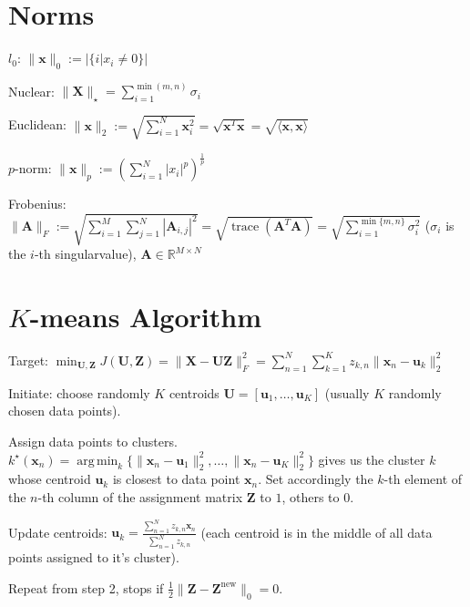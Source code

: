 \documentclass[a4paper, 11pt, landscape]{article}
\DeclareMathOperator*{\argmin}{arg\,min}
\begin{document}
\begin{multicols*}{3}
\section{Norms}
\begin{inparadesc}
	\item[\color{red}$l_0$:] $\|\mathbf{x}\|_0 := |\{i | x_i \neq 0\}|$
	\item[\color{red}Nuclear:] $\|\mathbf{X}\|_\star = \sum_{i=1}^{\min(m, n)} \sigma_i$
	\item[\color{red}Euclidean:] $\|\mathbf{x}\|_2 := \sqrt{\sum_{i=1}^{N} \mathbf{x}_i^2} = \sqrt{\mathbf{x}^T \mathbf{x}} = \sqrt{\langle \mathbf{x}, \mathbf{x} \rangle}$
	\item[\color{red}$p$-norm:] $\|\mathbf{x}\|_p := \left( \sum_{i=1}^{N} |x_i|^p \right)^{\frac{1}{p}}$
	\item[\color{red}Frobenius:] $\|\mathbf{A}\|_F :=\allowbreak \sqrt{\sum_{i=1}^{M} \sum_{j=1}^{N} |\mathbf{A}_{i, j}|^2} =\allowbreak \sqrt{\operatorname{trace}(\mathbf{A}^T \mathbf{A})} =\allowbreak \sqrt{\sum_{i=1}^{\min\{m, n\}} \sigma_i^2}$ ($\sigma_i$ is the $i$-th singularvalue), $\mathbf{A} \in \mathbb{R}^{M \times N}$
\end{inparadesc}

\section{$K$-means Algorithm}
\begin{inparadesc}
	\item[\color{red}Target:] $\min_{\mathbf{U}, \mathbf{Z}} J(\mathbf{U}, \mathbf{Z}) = \|\mathbf{X} - \mathbf{U} \mathbf{Z}\|_F^2 = \sum_{n=1}^N \sum_{k=1}^K z_{k,n} \|\mathbf{x}_n - \mathbf{u}_k\|_2^2$
\end{inparadesc}
\begin{inparaenum}
	\item Initiate: choose randomly $K$ centroids $\mathbf{U} = [\mathbf{u}_1, \ldots, \mathbf{u}_K]$ (usually $K$ randomly chosen data points).
	\item Assign data points to clusters. $k^\star(\mathbf{x}_n) = \argmin_k \{ \|\mathbf{x}_n - \mathbf{u}_1\|_2^2, \ldots, \|\mathbf{x}_n - \mathbf{u}_K\|_2^2 \}$ gives us the cluster $k$ whose centroid $\mathbf{u}_k$ is closest to data point $\mathbf{x}_n$. Set accordingly the $k$-th element of the $n$-th column of the assignment matrix $\mathbf{Z}$ to $1$, others to $0$.
	\item Update centroids: $\mathbf{u}_k = \frac{\sum_{n=1}^N z_{k,n} \mathbf{x}_n}{\sum_{n=1}^N z_{k,n}}$ (each centroid is in the middle of all data points assigned to it's cluster).
	\item Repeat from step 2, stops if $\frac{1}{2} \|\mathbf{Z} - \mathbf{Z}^\text{new}\|_0 = 0$.
\end{inparaenum}


\end{multicols*}
\end{document}
